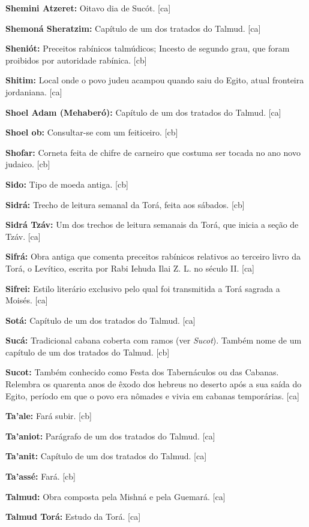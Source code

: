 \textbf{Shemini Atzeret:} Oitavo dia de Sucót. [ca]

\textbf{Shemoná Sheratzim:} Capítulo de um dos tratados do Talmud. [ca]

\textbf{Sheniót:} Preceitos rabínicos talmúdicos; Incesto de segundo grau, que foram proibidos por autoridade rabínica. [cb]

\textbf{Shitim:} Local onde o povo judeu acampou quando saiu do Egito, 
atual fronteira jordaniana. [ca]

\textbf{Shoel Adam (Mehaberó):} Capítulo de um dos tratados do Talmud. [ca]

\textbf{Shoel ob:} Consultar-se com um feiticeiro. [cb]

\textbf{Shofar:} Corneta feita de chifre de carneiro que costuma ser
tocada no ano novo judaico. [cb]

\textbf{Sido:} Tipo de moeda antiga. [cb]

\textbf{Sidrá:} Trecho de leitura semanal da Torá, feita aos sábados. [cb]

\textbf{Sidrá Tzáv:} Um dos trechos de leitura semanais da Torá, 
que inicia a seção de Tzáv. [ca]

\textbf{Sifrá:} Obra antiga que comenta preceitos rabínicos relativos
ao terceiro livro da Torá, o Levítico, escrita por Rabi Iehuda Ilai Z.
L. no século II. [ca]

\textbf{Sifrei:} Estilo literário exclusivo pelo qual
foi transmitida a Torá sagrada a Moisés. [ca]

\textbf{Sotá:} Capítulo de um dos tratados do Talmud. [ca]

\textbf{Sucá:} Tradicional cabana coberta com ramos (ver \emph{Sucot}). 
Também nome de um capítulo de um dos tratados do Talmud. [cb]

\textbf{Sucot:} Também conhecido como Festa dos Tabernáculos ou das Cabanas. 
Relembra os quarenta anos de êxodo dos hebreus no deserto após a sua saída 
do Egito, período em que o povo era nômades e vivia em cabanas temporárias. [ca]

\textbf{Ta'ale:} Fará subir. [cb]

\textbf{Ta'aniot:} Parágrafo de um dos tratados do Talmud. [ca]

\textbf{Ta'anit:} Capítulo de um dos tratados do Talmud. [ca]

\textbf{Ta'assé:} Fará. [cb]

\textbf{Talmud:} Obra composta pela Mishná e pela Guemará. [ca]

\textbf{Talmud Torá:} Estudo da Torá. [ca]

